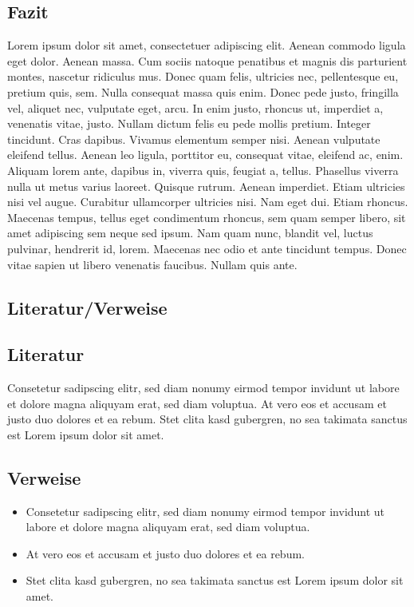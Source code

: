 \documentclass[a1paper, german, ngerman]{article}
\begin{document}
\begin{posterbox}
	\section*{Fazit}
	Lorem ipsum dolor sit amet, consectetuer adipiscing elit. Aenean commodo ligula eget dolor. Aenean massa. Cum sociis natoque penatibus et magnis dis parturient montes, nascetur ridiculus mus. Donec quam felis, ultricies nec, pellentesque eu, pretium quis, sem. Nulla consequat massa quis enim. Donec pede justo, fringilla vel, aliquet nec, vulputate eget, arcu. In enim justo, rhoncus ut, imperdiet a, venenatis vitae, justo. Nullam dictum felis eu pede mollis pretium. Integer tincidunt. Cras dapibus. Vivamus elementum semper nisi. Aenean vulputate eleifend tellus. Aenean leo ligula, porttitor eu, consequat vitae, eleifend ac, enim. Aliquam lorem ante, dapibus in, viverra quis, feugiat a, tellus. Phasellus viverra nulla ut metus varius laoreet. Quisque rutrum. Aenean imperdiet. Etiam ultricies nisi vel augue. Curabitur ullamcorper ultricies nisi. Nam eget dui. Etiam rhoncus. Maecenas tempus, tellus eget condimentum rhoncus, sem quam semper libero, sit amet adipiscing sem neque sed ipsum. Nam quam nunc, blandit vel, luctus pulvinar, hendrerit id, lorem. Maecenas nec odio et ante tincidunt tempus. Donec vitae sapien ut libero venenatis faucibus. Nullam quis ante.
\end{posterbox}

\vfill

\begin{posterbox}
	\section*{Literatur/Verweise}
	\subsection*{Literatur}
	Consetetur sadipscing elitr, sed diam nonumy eirmod tempor invidunt ut labore et dolore magna aliquyam erat, sed diam voluptua. At vero eos et accusam et justo duo dolores et ea rebum. Stet clita kasd gubergren, no sea takimata sanctus est Lorem ipsum dolor sit amet.

	\subsection*{Verweise}
	\begin{itemize}
		\item Consetetur sadipscing elitr, sed diam nonumy eirmod tempor invidunt ut labore et dolore magna aliquyam erat, sed diam voluptua.
		\item At vero eos et accusam et justo duo dolores et ea rebum.
		\item Stet clita kasd gubergren, no sea takimata sanctus est Lorem ipsum dolor sit amet.
	\end{itemize}
\end{posterbox}
\end{document}
